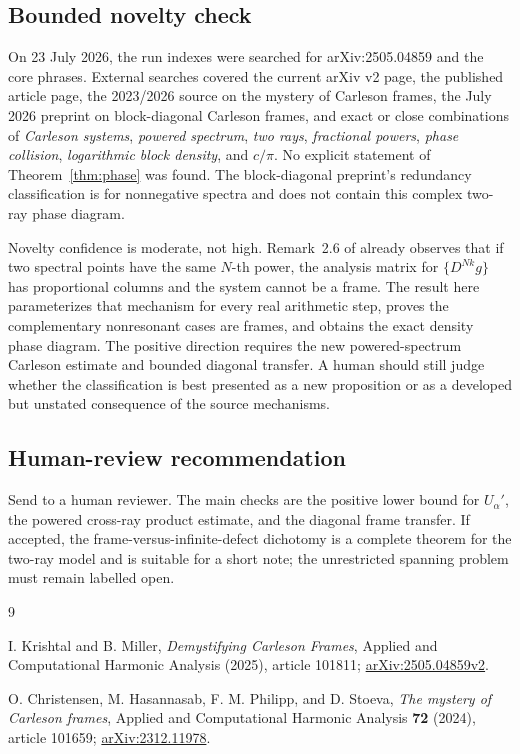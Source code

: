 \documentclass[11pt]{article}
\theoremstyle{definition}
\begin{document}
\subsection*{Bounded novelty check}

On 23 July 2026, the run indexes were searched for arXiv:2505.04859 and the
core phrases.  External searches covered the current arXiv v2 page, the
published article page, the 2023/2026 source on the mystery of Carleson
frames, the July 2026 preprint on block-diagonal Carleson frames, and exact
or close combinations of \emph{Carleson systems}, \emph{powered spectrum},
\emph{two rays}, \emph{fractional powers}, \emph{phase collision},
\emph{logarithmic block density}, and \(c/\pi\).  No explicit statement of
Theorem~\ref{thm:phase} was found.  The block-diagonal preprint's redundancy
classification is for nonnegative spectra and does not contain this complex
two-ray phase diagram.

Novelty confidence is moderate, not high.  Remark~2.6 of \cite{KM} already
observes that if two spectral points have the same \(N\)-th power, the
analysis matrix for \(\{D^{Nk}g\}\) has proportional columns and the system
cannot be a frame.  The result here parameterizes that mechanism for every
real arithmetic step, proves the complementary nonresonant cases are
frames, and obtains the exact density phase diagram.  The positive direction
requires the new powered-spectrum Carleson estimate and bounded diagonal
transfer.  A human should still judge whether the classification is best
presented as a new proposition or as a developed but unstated consequence
of the source mechanisms.

\subsection*{Human-review recommendation}

Send to a human reviewer.  The main checks are the positive lower bound for
\(U_\alpha'\), the powered cross-ray product estimate, and the diagonal
frame transfer.  If accepted, the frame-versus-infinite-defect dichotomy is
a complete theorem for the two-ray model and is suitable for a short note;
the unrestricted spanning problem must remain labelled open.

\begin{thebibliography}{9}

I. Krishtal and B. Miller,
\emph{Demystifying Carleson Frames},
Applied and Computational Harmonic Analysis (2025),
article 101811;
\href{https://arxiv.org/abs/2505.04859}{arXiv:2505.04859v2}.

O. Christensen, M. Hasannasab, F. M. Philipp, and D. Stoeva,
\emph{The mystery of Carleson frames},
Applied and Computational Harmonic Analysis \textbf{72} (2024),
article 101659;
\href{https://arxiv.org/abs/2312.11978}{arXiv:2312.11978}.

\end{thebibliography}
\end{document}

